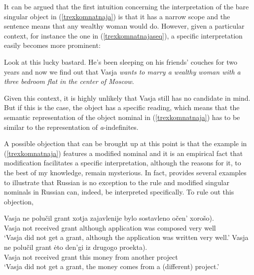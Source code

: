 \documentclass[output=paper,colorlinks,citecolor=brown]{langscibook}
\begin{document}
\noindent It can be argued that the first intuition concerning the interpretation of the bare singular object in (\ref{trexkomnatnaja}) is that it has a narrow scope and the sentence means that any wealthy woman would do. However, given a particular context, for instance the one in (\ref{trexkomnatnajaseq}), a specific interpretation easily becomes more prominent: 

\ea \label{trexkomnatnajaseq}
Look at this lucky bastard. He's been sleeping on his friends' couches for two years and now we find out that Vasja \textit{wants to marry a wealthy woman with a three bedroom flat in the center of Moscow}. 
\z

\noindent Given this context, it is highly unlikely that Vasja still has no candidate in mind. %
But if this is the case, the object has a specific reading, which means that 
the semantic representation of the object nominal in (\ref{trexkomnatnaja}) has to be similar to the representation of \textit{a}-indefinites. 

A possible objection that can be brought up at this point is that the example in (\ref{trexkomnatnaja}) features a modified nominal and it is an empirical fact that modification facilitates a specific interpretation, although the reasons for it, to the best of my knowledge, remain mysterious. In fact, \citet{geist10} provides several examples to illustrate that Russian is no exception to the rule and modified singular nominals in Russian can, indeed, be interpreted specifically. To rule out this objection,  
\fi 

\ea \label{grant}
\ea \gll
Vasja ne polu\v{c}il grant \minsp{(} xotja 	zajavlenije 	bylo sostavleno 	o\v{c}en'	xoro\v{s}o). \label{granta}\\
 Vasja not received grant {} although 	application 	was composed 		very 		well\\
\glt `Vasja did not get a grant, although the application was written very well.'		 	  
\ex \gll
Vasja ne polu\v{c}il grant \minsp{(} \.{e}to 	den'gi 		iz 			drugogo 	proekta).   \label{grantb}\\
Vasja not received grant {} this money 		from 	 another 		project\\
\glt `Vasja did not get a grant, the money comes from a (different) project.'
\z
\z
\end{document}
